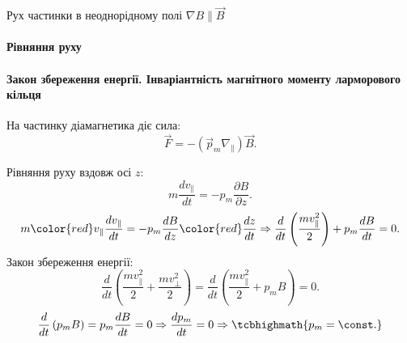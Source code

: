 \documentclass[]{beamer}
\begin{document}
\begin{frame}{Рух частинки в неоднорідному полі $\nabla B \parallel \vec{B}$}
	\framesubtitle<1>{Рівняння руху}
	\framesubtitle<2>{Закон збереження енергії. Інваріантність магнітного моменту ларморового кільця}
	На частинку діамагнетика діє сила:
	\begin{equation*}
		\vec{F} = -(\vec{p}_m\nabla_\parallel) \vec{B}.
	\end{equation*}
	
	\begin{overprint}
		Рівняння руху вздовж осі $z$:
		\begin{equation*}
			m\frac{dv_\parallel}{dt} = -p_m\frac{\partial B}{\partial z}.
		\end{equation*}
		\begin{equation*}
			m{\color{red}v_\parallel}\frac{dv_\parallel}{dt} = -p_m\frac{d B}{d z}{\color{red}\frac{dz}{dt}}  \Rightarrow \frac{d}{dt}\left(\frac{mv^2_\parallel}{2} \right) + p_m\frac{dB}{dt} = 0.
		\end{equation*}
		\onslide<2>
		Закон збереження енергії:
		\begin{equation*}
			\frac{d}{dt}\left(\frac{mv^2_\parallel}{2} + \frac{mv^2_\perp}{2} \right) = \frac{d}{dt}\left(\frac{mv^2_\parallel}{2} + p_mB \right) = 0.
		\end{equation*}
		\begin{equation*}
			\frac{d}{dt} \left( p_mB\right) = p_m\frac{dB}{dt} = 0 \Rightarrow \frac{dp_m}{dt} = 0 \Rightarrow \tcbhighmath{p_m = \const.}
		\end{equation*}
	\end{overprint}
\end{frame}
\end{document}
